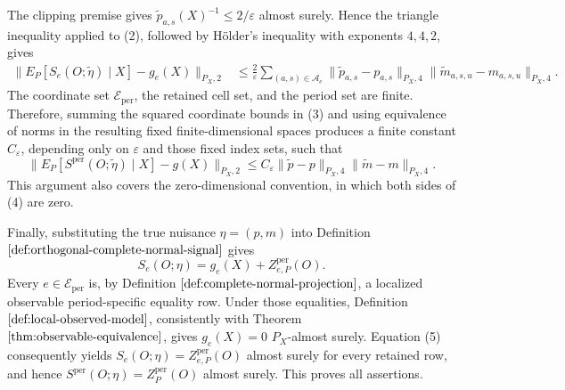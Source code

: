 The clipping premise gives
\(\widetilde p_{a,s}(X)^{-1}\leq 2/\varepsilon\) almost surely.  Hence the triangle inequality applied to (2), followed by H\"older's inequality with exponents \(4,4,2\), gives
\[
\begin{aligned}
\|E_P[S_e(O;\widetilde\eta)\mid X]-g_e(X)\|_{P_X,2}
&\leq \frac{2}{\varepsilon}
 \sum_{(a,s)\in\mathcal A_e}
 \|\widetilde p_{a,s}-p_{a,s}\|_{P_X,4}
 \|\widetilde m_{a,s,u}-m_{a,s,u}\|_{P_X,4}.
\end{aligned}
\tag{3}
\]
The coordinate set \(\mathcal E_{\mathrm{per}}\), the retained cell set, and the period set are finite.  Therefore, summing the squared coordinate bounds in (3) and using equivalence of norms in the resulting fixed finite-dimensional spaces produces a finite constant \(C_\varepsilon\), depending only on \(\varepsilon\) and those fixed index sets, such that
\[
\|E_P[S^{\mathrm{per}}(O;\widetilde\eta)\mid X]-g(X)\|_{P_X,2}
\leq C_\varepsilon
\|\widetilde p-p\|_{P_X,4}
\|\widetilde m-m\|_{P_X,4}.
\tag{4}
\]
This argument also covers the zero-dimensional convention, in which both sides of (4) are zero.

Finally, substituting the true nuisance \(\eta=(p,m)\) into Definition \(\ref{def:orthogonal-complete-normal-signal}\) gives
\[
S_e(O;\eta)=g_e(X)+Z^{\mathrm{per}}_{e,P}(O).
\tag{5}
\]
Every \(e\in\mathcal E_{\mathrm{per}}\) is, by Definition \(\ref{def:complete-normal-projection}\), a localized observable period-specific equality row.  Under those equalities, Definition \(\ref{def:local-observed-model}\), consistently with Theorem \(\ref{thm:observable-equivalence}\), gives \(g_e(X)=0\) \(P_X\)-almost surely.  Equation (5) consequently yields
\(S_e(O;\eta)=Z^{\mathrm{per}}_{e,P}(O)\) almost surely for every retained row, and hence
\(S^{\mathrm{per}}(O;\eta)=Z_P^{\mathrm{per}}(O)\) almost surely.  This proves all assertions.
